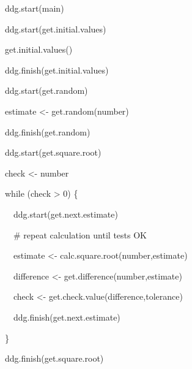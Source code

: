 \documentclass[letterpaper]{article}
\begin{document}
{\color{black}
ddg.start({\textquotedbl}main{\textquotedbl})}


\bigskip

{\mdseries\upshape\color{black}
ddg.start({\textquotedbl}get.initial.values{\textquotedbl})}

{\mdseries\upshape\color{black}
get.initial.values()}

{\mdseries\upshape\color{black}
ddg.finish({\textquotedbl}get.initial.values{\textquotedbl})}


\bigskip

{\mdseries\upshape\color{black}
ddg.start({\textquotedbl}get.random{\textquotedbl})}

{\mdseries\upshape\color{black}
estimate {\textless}- get.random(number)}

{\mdseries\upshape\color{black}
ddg.finish({\textquotedbl}get.random{\textquotedbl})}


\bigskip

{\mdseries\upshape\color{black}
ddg.start({\textquotedbl}get.square.root{\textquotedbl})}


\bigskip

{\mdseries\upshape\color{black}
check {\textless}- number}


\bigskip

{\mdseries\upshape\color{black}
while (check {\textgreater} 0) \{}

{\mdseries\upshape\color{black}
\ \ ddg.start({\textquotedbl}get.next.estimate{\textquotedbl})}


\bigskip

{\mdseries\upshape\color{black}
\ \ \# repeat calculation until tests OK}

{\mdseries\upshape\color{black}
\ \ estimate {\textless}- calc.square.root(number,estimate)}

{\mdseries\upshape\color{black}
\ \ difference {\textless}- get.difference(number,estimate)}

{\mdseries\upshape\color{black}
\ \ check {\textless}- get.check.value(difference,tolerance)}


\bigskip

{\mdseries\upshape\color{black}
\ \ ddg.finish({\textquotedbl}get.next.estimate{\textquotedbl})}

{\mdseries\upshape\color{black}
\}}


\bigskip

{\mdseries\upshape\color{black}
ddg.finish({\textquotedbl}get.square.root{\textquotedbl})}


\bigskip
\end{document}
